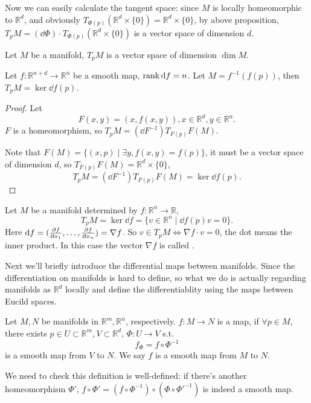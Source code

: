 Now we can easily calculate the tangent space:
since $M$ is locally homeomorphic to $\mathbb{R}^{d}$, and obviously
$T_{\Phi(p)}(\mathbb{R}^{d}\times \{0\}) = \mathbb{R}^{d} \times \{0\}$,
by above proposition,
$T_p M = (\dd \Phi)\cdot T_{\Phi(p)}(\mathbb{R}^{d} \times \{0\})$ is
a vector space of dimension $d$.

\begin{theorem}
    Let $M$ be a manifold, $T_p M$ is a vector space of dimension $\dim M$.
\end{theorem}
\begin{proposition}
	Let $f: \mathbb{R}^{n+d}\to \mathbb{R}^{n}$ be a smooth map,
	$\operatorname{rank} \mathop{}\!\mathrm{d} f = n$. Let $M = f^{-1}(f(p))$, then $T_pM = \ker \dd f(p)$.
\end{proposition}
\begin{proof}[Proof]
    Let
	\[
		F(x, y) = (x, f(x, y)), x\in \mathbb{R}^{d}, y\in \mathbb{R}^{n}.
	\]
	$F$ is a homeomorphism, so $T_pM = (\dd F^{-1}) T_{F(p)}F(M)$.

	Note that $F(M) = \{(x, p)\mid \exists y, f(x, y) = f(p)\}$, it must
	be a vector space of dimension $d$,
	so $T_{F(p)} F(M) = \mathbb{R}^{d}\times \{0\}$,
	\[
	T_p M = (\dd F^{-1}) T_{F(p)}F(M) = \ker \dd f(p).
	\]
\end{proof}
\begin{example}
    Let $M$ be a manifold determined by $f: \mathbb{R}^{n}\to \mathbb{R}$,
	\[
	T_p M = \ker \dd f = \{v\in \mathbb{R}^{n}\mid \dd f(p) v = 0\}.
	\]
	Here $\mathop{}\!\mathrm{d} f = (\frac{\partial f}{\partial x_1}, \dots, \frac{\partial f}{\partial x_n}) = \nabla f$.
	So $v\in T_p M \iff \nabla f \cdot v = 0$, the dot means the inner product.
	In this case the vector $\nabla f$ is called .
\end{example}

Next we'll briefly introduce the differential maps between manifolds.
Since the differentiation on manifolds is hard to define, so what we
do is actually regarding manifolds as $\mathbb{R}^{d}$ locally and
define the differentiablity using the maps between Eucild spaces.
\begin{definition}
	Let $M, N$ be manifolds in $\mathbb{R}^{m}, \mathbb{R}^{n}$, respectively.
	$f: M\to N$ is a map, if $\forall p\in M$,
	there exists $p\in U \subset \mathbb{R}^m,
	V \subset \mathbb{R}^d$, $\Phi: U\to V$ s.t.
	\[
	f_\Phi = f\circ \Phi^{-1}
	\]
	is a smooth map from $V$ to $N$.
	We say $f$ is a smooth map from $M$ to $N$.
\end{definition}
We need to check this definition is well-defined:
if there's another homeomorphism $\Phi'$,
$f \circ \Phi' = (f\circ \Phi^{-1})\circ(\Phi \circ \Phi'^{-1})$ is indeed
a smooth map.

